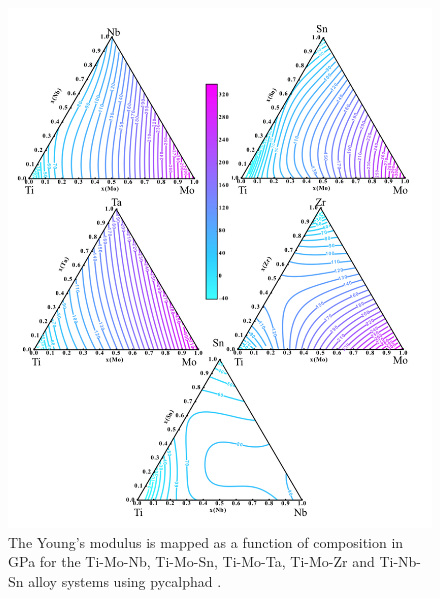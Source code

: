 \pagebreak
\begin{figure}[H]
	\centering
	\includegraphics[width=\textwidth]{Chapter-6/Figures/tixymap1.png}
	\caption{The Young's modulus is mapped as a function of composition in GPa for the Ti-Mo-Nb, Ti-Mo-Sn, Ti-Mo-Ta, Ti-Mo-Zr and Ti-Nb-Sn alloy systems using pycalphad \cite{Otis2017}.}
	\label{Ch6-figure:tixymap1}
\end{figure}

